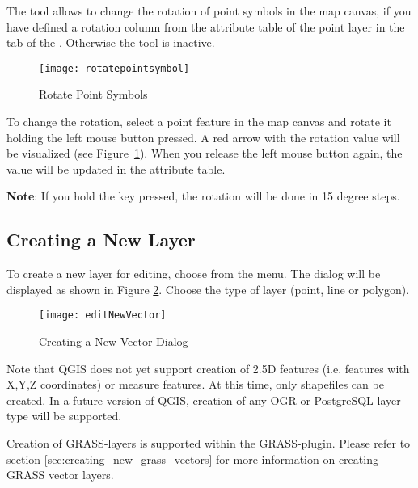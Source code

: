 
The  tool 
allows to change the rotation of point symbols in the map canvas, if 
you have defined a rotation column from the attribute table of the point 
layer in the  tab of the . 
Otherwise the tool is inactive.

\begin{figure}[ht]
   \centering
   \caption{Rotate Point Symbols \nixcaption}\label{fig:rotatepoint}
   \texttt{[image: rotatepointsymbol]}
\end{figure}

To change the rotation, select a point feature in the map canvas and rotate 
it holding the left mouse button pressed. A red arrow with the rotation value 
will be visualized (see Figure~\ref{fig:rotatepoint}). When you release the 
left mouse button again, the value will be updated in the attribute table. 

\textbf{Note}: If you hold the  key pressed, the rotation will be done 
in 15 degree steps.

\subsection{Creating a New Layer}\label{sec:create shape}

To create a new layer for editing, choose  from the
 menu. 
The  dialog will be displayed as
shown in Figure \ref{fig:newvectorlayer}. Choose the type of layer (point,
line or polygon).

\begin{figure}[ht]
   \centering
   \caption{Creating a New Vector Dialog \nixcaption}\label{fig:newvectorlayer}
   \texttt{[image: editNewVector]}
\end{figure}

Note that QGIS does not yet support creation of 2.5D
features (i.e. features with X,Y,Z coordinates) or measure features. At this
time, only shapefiles can be created. In a future version of QGIS, creation of
any OGR or PostgreSQL layer type will be supported. 

Creation of GRASS-layers is supported within the GRASS-plugin. Please refer to section
\ref{sec:creating_new_grass_vectors} for more information on creating GRASS vector 
layers.

